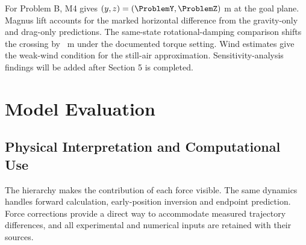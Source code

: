 \documentclass[12pt,letterpaper]{article}
\begin{document}
For Problem B, M4 gives $(y,z)=(\ProblemY,\ProblemZ)$ m at the goal plane. Magnus lift accounts for the marked horizontal difference from the gravity-only and drag-only predictions. The same-state rotational-damping comparison shifts the crossing by \TorqueDisplacement\ m under the documented torque setting. Wind estimates give the weak-wind condition for the still-air approximation. Sensitivity-analysis findings will be added after Section 5 is completed.

\section{Model Evaluation}
\subsection{Physical Interpretation and Computational Use}
The hierarchy makes the contribution of each force visible. The same dynamics handles forward calculation, early-position inversion and endpoint prediction. Force corrections provide a direct way to accommodate measured trajectory differences, and all experimental and numerical inputs are retained with their sources.
\end{document}
